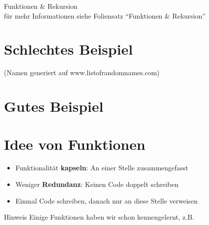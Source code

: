 



\begin{titleframe}
	\begin{center}
		\vspace{1cm}
		{\huge Funktionen \& Rekursion}\\
		\vspace {1.0cm}
		für mehr Informationen siehe Foliensatz "`Funktionen \& Rekursion"'
	\end{center}

\end{titleframe}

\tocslide

\section{Schlechtes Beispiel}
\begin{frame}
	\slidehead

	\vskip -10pt
	\small (Namen generiert auf www.listofrandomnames.com)
\end{frame}


\section{Gutes Beispiel}
\begin{frame}
	\slidehead
\end{frame}

\section{Idee von Funktionen}
\begin{frame}
	\slidehead

	\begin{itemize}
		\item Funktionalität \textbf{kapseln}: An einer Stelle zusammengefasst
		\item Weniger \textbf{Redundanz}: Keinen Code doppelt schreiben
		\item Einmal Code schreiben, danach nur an diese Stelle verweisen
	\end{itemize}
	\vspace{1cm}
	\begin{block}{Hinweis}
		Einige Funktionen haben wir schon kennengelernt, z.B. 
	\end{block}
\end{frame}

